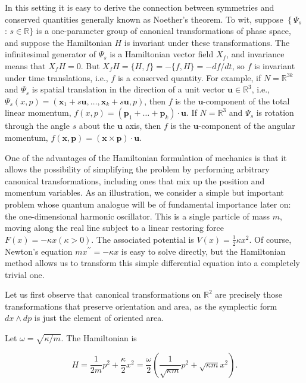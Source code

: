 \documentclass[10pt, letterpaper]{article}
\begin{document}
In this setting it is easy to derive the connection between symmetries and conserved quantities generally known as Noether's theorem. To wit, suppose $\left\{\Psi_{s}\right.$ : $s \in \mathbb{R}\}$ is a one-parameter group of canonical transformations of phase space, and suppose the Hamiltonian $H$ is invariant under these transformations. The infinitesimal generator of $\Psi_{s}$ is a Hamiltonian vector field $X_{f}$, and invariance means that $X_{f} H=0$. But $X_{f} H=\{H, f\}=-\{f, H\}=-d f / d t$, so $f$ is invariant under time translations, i.e., $f$ is a conserved quantity. For example, if $N=\mathbb{R}^{3 k}$ and $\Psi_{s}$ is spatial translation in the direction of a unit vector $\mathbf{u} \in \mathbb{R}^{3}$, i.e., $\Psi_{s}(x, p)= \left(\mathbf{x}_{1}+s \mathbf{u}, \ldots, \mathbf{x}_{k}+s \mathbf{u}, p\right)$, then $f$ is the $\mathbf{u}$-component of the total linear momentum, $f(x, p)=\left(\mathbf{p}_{1}+\ldots+\mathbf{p}_{k}\right) \cdot \mathbf{u}$. If $N=\mathbb{R}^{3}$ and $\Psi_{s}$ is rotation through the angle $s$ about the $\mathbf{u}$ axis, then $f$ is the $\mathbf{u}$-component of the angular momentum, $f(\mathbf{x}, \mathbf{p})= (\mathbf{x} \times \mathbf{p}) \cdot \mathbf{u}$.

One of the advantages of the Hamiltonian formulation of mechanics is that it allows the possibility of simplifying the problem by performing arbitrary canonical transformations, including ones that mix up the position and momentum variables. As an illustration, we consider a simple but important problem whose quantum analogue will be of fundamental importance later on: the one-dimensional harmonic oscillator. This is a single particle of mass $m$, moving along the real line subject to a linear restoring force $F(x)=-\kappa x(\kappa>0)$. The associated potential is $V(x)= \frac{1}{2} \kappa x^{2}$. Of course, Newton's equation $m x^{\prime \prime}=-\kappa x$ is easy to solve directly, but the Hamiltonian method allows us to transform this simple differential equation into a completely trivial one.

Let us first observe that canonical transformations on $\mathbb{R}^{2}$ are precisely those transformations that preserve orientation and area, as the symplectic form $d x \wedge d p$ is just the element of oriented area.

Let $\omega=\sqrt{\kappa / m}$. The Hamiltonian is

$$
H=\frac{1}{2 m} p^{2}+\frac{\kappa}{2} x^{2}=\frac{\omega}{2}\left(\frac{1}{\sqrt{\kappa m}} p^{2}+\sqrt{\kappa m} x^{2}\right) .
$$
\end{document}

